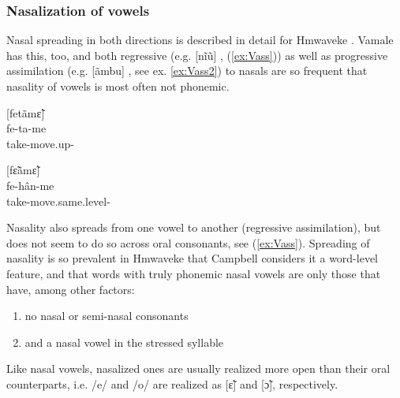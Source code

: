 	\subsubsection{Nasalization of vowels}
	\label{ssec:NasalV}
	Nasal spreading in both directions is described in detail for Hmwaveke \parencite[66, 76]{campbell_phenomenon_1987}. Vamale has this, too, and both regressive (e.g. [nĩũ] , (\ref{ex:Vass})) as well as progressive assimilation (e.g. [ãmbu] , see ex. \ref{ex:Vass2}) to nasals are so frequent that nasality of vowels is most often not phonemic.
	

\ea\label{ex:Vass} 		
[fetãmɛ̃]\\
\gll fe-ta-me\\
		 take-move.up-\\
\glt {} 
\z


\ea\label{ex:Vass2}
[fɛ̃ãmɛ̃]\\
\gll fe-hân-me\\		
 take-move.same.level-\\		
\glt {}
\z



	
	Nasality also spreads from one vowel to another (regressive assimilation), but does not seem to do so across oral consonants, see (\ref{ex:Vass}). Spreading of nasality is so prevalent in Hmwaveke that Campbell considers it a word-level feature, and that words with truly phonemic nasal vowels are only those that have, among other factors: \begin{enumerate}
		\item no nasal or semi-nasal consonants
		\item and a nasal vowel in the stressed syllable \parencite[66]{campbell_phenomenon_1987}
	\end{enumerate}
	Like nasal vowels, nasalized ones are usually realized more open than their oral counterparts, i.e. /e/ and /o/ are realized as [ɛ̃] and [ɔ̃], respectively. %

	
